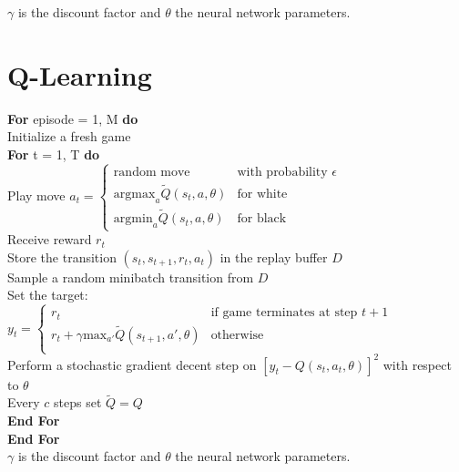\documentclass{article}
\begin{document}
\noindent $\gamma$ is the discount factor and $\theta$ the neural network parameters.

\pagebreak


\section{Q-Learning}

\textbf{For} episode = 1, M \textbf{do} \\
\indent Initialize a fresh game \\
\indent \textbf {For} t = 1, T \textbf{do} \\
\indent \indent Play move
$
a_t= 
\begin{cases}
\text{random move} 							  & \text{with probability } \epsilon \\
\text{argmax}_a \tilde{Q}(s_t, a, \theta)     & \text{for white} \\
\text{argmin}_a \tilde{Q}(s_t, a, \theta)     & \text{for black}
\end{cases}
$ \\
\indent \indent Receive reward $r_t$  \\
\indent \indent Store the transition $(s_t, s_{t+1}, r_t, a_t)$ in the replay buffer $D$ \\
\indent \indent Sample a random minibatch transition from $D$  \\
\indent \indent Set the target: 
$
y_t= 
\begin{cases}
r_t 										& \text{if game terminates at step } t+1 \\
r_{t} + \gamma \text{max}_{a'}\tilde{Q}(s_{t+1}, a', \theta)   & \text{otherwise} \\
\end{cases}
$ \\
\indent \indent Perform a stochastic gradient decent step on $[y_t - Q(s_t, a_t, \theta)]^2$ with respect to $\theta$  \\
\indent \indent Every $c$ steps set $\tilde{Q} = Q$   \\
\indent  \textbf {End For}  \\
\textbf {End For} \\

\noindent $\gamma$ is the discount factor and $\theta$ the neural network parameters.
\end{document}
